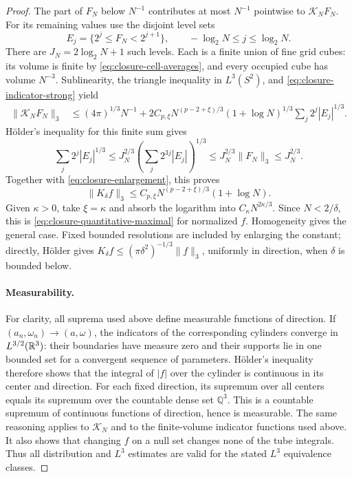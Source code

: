 \begin{proof}
The part of \(F_N\) below \(N^{-1}\) contributes at most
\(N^{-1}\) pointwise to \(\mathcal K_N F_N\).  For its remaining
values use the disjoint level sets
\[
  E_j=\{2^j\le F_N<2^{j+1}\},
  \qquad -\log_2N\le j\le\log_2N.
\]
There are \(J_N=2\log_2N+1\) such levels.  Each is a finite union
of fine grid cubes: its volume is finite by
\eqref{eq:closure-cell-averages}, and every occupied cube has volume
\(N^{-3}\).  Sublinearity, the triangle inequality in \(L^3(S^2)\),
and \eqref{eq:closure-indicator-strong} yield
\begin{align*}
  \|\mathcal K_N F_N\|_3
    &\le (4\pi)^{1/3}N^{-1}
       +2C_{p,\xi}N^{(p-2+\xi)/3}(1+\log N)^{1/3}
                      \sum_j2^j|E_j|^{1/3}.
\end{align*}
Hölder's inequality for this finite sum gives
\[
  \sum_j2^j|E_j|^{1/3}
     \le J_N^{2/3}\left(\sum_j2^{3j}|E_j|\right)^{1/3}
     \le J_N^{2/3}\|F_N\|_3\le J_N^{2/3}.
\]
Together with \eqref{eq:closure-enlargement}, this proves
\[
  \|K_\delta f\|_3
     \le C_{p,\xi}N^{(p-2+\xi)/3}(1+\log N).
\]
Given \(\kappa>0\), take \(\xi=\kappa\) and absorb the logarithm
into \(C_\kappa N^{2\kappa/3}\).  Since \(N<2/\delta\), this is
\eqref{eq:closure-quantitative-maximal} for normalized \(f\).
Homogeneity gives the general case.  Fixed bounded resolutions are
included by enlarging the constant; directly, Hölder gives
\(K_\delta f\le(\pi\delta^2)^{-1/3}\|f\|_3\), uniformly in
direction, when \(\delta\) is bounded below.

\paragraph{Measurability.}
For clarity, all suprema used above define measurable functions of
direction.  If \((a_n,\omega_n)\to(a,\omega)\), the indicators of
the corresponding cylinders converge in \(L^{3/2}(\mathbb R^3)\): their
boundaries have measure zero and their supports lie in one bounded set
for a convergent sequence of parameters.  Hölder's inequality therefore
shows that the integral of \(|f|\) over the cylinder is continuous
in its center and direction.  For each fixed direction, its supremum
over all centers equals its supremum over the countable dense set
\(\mathbb Q^3\).  This is a countable supremum of continuous functions
of direction, hence is measurable.  The same reasoning applies to
\(\mathcal K_N\) and to the finite-volume indicator functions used
above.  It also shows that changing \(f\) on a null set changes none
of the tube integrals.  Thus all distribution and \(L^3\) estimates
are valid for the stated \(L^3\) equivalence classes.
\end{proof}

